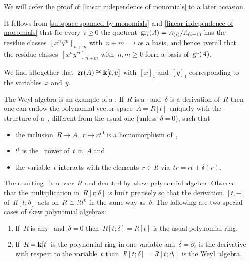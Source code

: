\begin{example}
  We will defer the proof of \cref{linear independence of monomials} to a later occasion.
  
  It follows from \cref{subspace spanned by monomials} and \cref{linear independence of monomials} that for every~$i \geq 0$ the quotient~$\gr[i](A) = A_{(i)} / A_{(i-1)}$ has the residue classes~$[x^n y^m]_{n+m}$ with~$n+m = i$ as a basis, and hence overall that the residue classes~$[x^n y^m]_{n+m}$ with~$n, m \geq 0$ form a basis of~$\gr(A)$.
  
  We find altogether that~$\gr(A) \cong \kf[t,u]$ with~$[x]_1$ and~$[y]_1$ corresponding to the variables~$x$ and~$y$.
\end{example}


\begin{remark}
  The Weyl algebra is an example of a :
  If~$R$ is a~{\algebra{$\kf$}} and~$\delta$ is a derivation of~$R$ then one can endow the polynomial vector space~$A = R[t]$ uniquely with the structure of a~{\algebra{$\kf$}}, different from the usual one (unless~$\delta = 0$), such that
  \begin{itemize}
    \item
      the inclusion~$R \to A$,~$r \mapsto r t^0$ is a homomorphism of~{\algebras{$\kf$}},
    \item
      $t^i$ is the~{} power of~$t$ in~$A$ and
    \item
      the variable~$t$ interacts with the elements~$r \in R$ via~$t r = r t + \delta(r)$.
  \end{itemize}
  The resulting~{\algebra{$\kf$}} is a  over~$R$ and denoted by~\gls*{skew polynomial algebra}.
  Observe that the multiplication in~$R[t;\delta]$ is built precisely so that the derivation~$[t,-]$ of~$R[t;\delta]$ acts on~$R \cong R t^0$ in the same way as~$\delta$.
  The following are two special cases of skew polynomial algebras:
  \begin{enumerate}
    \item
      If~$R$ is any~{\algebra{$\kf$}} and~$\delta = 0$ then~$R[t; \delta] = R[t]$ is the usual polynomial ring.
    \item
      If~$R = \mathbf{k}[t]$ is the polynomial ring in one variable and~$\delta = \partial_t$ is the derivative with respect to the variable~$t$ than~$R[t;\delta] = R[t;\partial_t]$ is the Weyl~algebra.
  \end{enumerate}
  

\end{remark}
